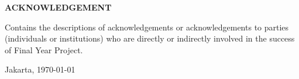 \begin{center}
	\fontsize{14pt}{1.5\baselineskip}\selectfont
	\textbf{ACKNOWLEDGEMENT}
\end{center}
\begin{justify}
	\begin{doublespace}
		Contains the descriptions of acknowledgements or acknowledgements to parties (individuals or institutions) who are directly or indirectly involved in the success of Final Year Project.
	\end{doublespace}
	\fontsize{12pt}{18pt}\selectfont

	\noindent Jakarta, \today
	
	
	\noindent \AUTHOR
\end{justify}
\pagebreak
